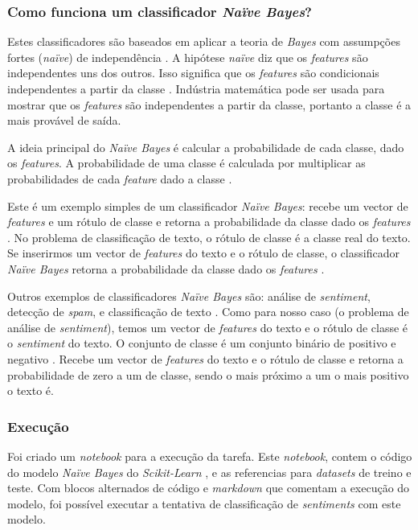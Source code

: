 \subsubsection{Como funciona um classificador \textit{Naïve Bayes}?}

Estes classificadores são baseados em aplicar a teoria de \textit{Bayes} com assumpções fortes (\textit{naïve}) de independência \cite{mbn1}. A hipótese \textit{naïve} diz que os \textit{features} são independentes uns dos outros. Isso significa que os \textit{features} são condicionais independentes a partir da classe \cite{gfg2}. Indústria matemática pode ser usada para mostrar que os \textit{features} são independentes a partir da classe, portanto a classe é a mais provável de saída.

A ideia principal do \textit{Naïve Bayes} é calcular a probabilidade de cada classe, dado os \textit{features}. A probabilidade de uma classe é calculada por multiplicar as probabilidades de cada \textit{feature} dado a classe \cite{mbn1}.

Este é um exemplo simples de um classificador \textit{Naïve Bayes}: recebe um vector de \textit{features} e um rótulo de classe e retorna a probabilidade da classe dado os \textit{features} \cite{skl1}. No problema de classificação de texto, o rótulo de classe é a classe real do texto. Se inserirmos um vector de \textit{features} do texto e o rótulo de classe, o classificador \textit{Naïve Bayes} retorna a probabilidade da classe dado os \textit{features} \cite{gfg2}.

Outros exemplos de classificadores \textit{Naïve Bayes} são: análise de \textit{sentiment}, detecção de \textit{spam}, e classificação de texto \cite{mbn1}. Como para nosso caso (o problema de análise de \textit{sentiment}), temos um vector de \textit{features} do texto e o rótulo de classe é o \textit{sentiment} do texto. O conjunto de classe é um conjunto binário de positivo e negativo \cite{gfg2}. Recebe um vector de \textit{features} \cite{skl1} do texto e o rótulo de classe e retorna a probabilidade de zero a um de classe, sendo o mais próximo a um o mais positivo o texto é.

\subsubsection{Execução}

Foi criado um \textit{notebook} para a execução da tarefa. Este \textit{notebook}, contem o código do modelo \textit{Naïve Bayes} do \textit{Scikit-Learn} \cite{skl1}, e as referencias para \textit{datasets} de treino e teste. Com blocos alternados de código e \textit{markdown} que comentam a execução do modelo, foi possível executar a tentativa de classificação de \textit{sentiments} com este modelo.

